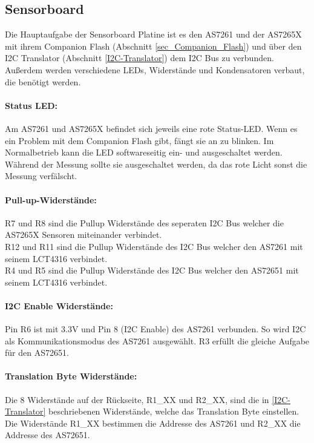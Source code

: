 \subsection{Sensorboard}
Die Hauptaufgabe der Sensorboard Platine ist es den AS7261 und der AS7265X mit ihrem Companion Flash (Abschnitt \ref{sec_Companion_Flash}) und über den I2C Translator (Abschnitt \ref{I2C-Translator}) dem I2C Bus zu verbunden.
Außerdem werden verschiedene LEDs, Widerstände und Kondensatoren verbaut, die benötigt werden.


\paragraph{Status LED:} Am AS7261 und AS7265X befindet sich je­weils eine rote Status-LED. Wenn es ein Problem mit dem Companion Flash gibt, fängt sie an zu blinken. Im Normalbetrieb kann die LED softwareseitig ein- und ausgeschaltet werden.
	Während der Messung sollte sie ausgeschaltet werden, da das rote Licht sonst die Messung verfälscht.

\paragraph{Pull-up-Widerstände:}
R7 und R8 sind die Pullup Widerstände des seperaten I2C Bus welcher die AS7265X Sensoren miteinander verbindet.\\
R12 und R11 sind die Pullup Widerstände des I2C Bus welcher den AS7261 mit seinem LCT4316 verbindet.\\
R4 und R5 sind die Pullup Widerstände des I2C Bus welcher den AS72651 mit seinem LCT4316 verbindet.

\paragraph{I2C Enable Widerstände:} Pin R6 ist mit 3.3V und Pin 8 (I2C Enable) des AS7261 verbunden. So wird 
I2C als Kommunikationsmodus des AS7261 ausgewählt.
	R3 erfüllt die gleiche Aufgabe für den AS72651.
	
\paragraph{Translation Byte Widerstände:}
Die 8 Widerstände auf der Rückseite, R1\_XX und R2\_XX, sind die in \ref{I2C-Translator} beschriebenen Widerstände, welche das Translation Byte einstellen. Die Widerstände R1\_XX bestimmen die Addresse des AS7261 und R2\_XX die Addresse des AS72651.

